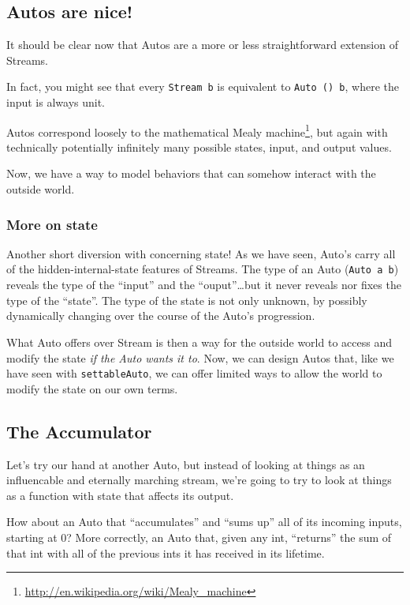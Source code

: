 \documentclass[]{article}
\renewcommand{\href}[2]{#2\footnote{\url{#1}}}
\begin{document}
\subsection{Autos are nice!}\label{autos-are-nice}

It should be clear now that Autos are a more or less straightforward
extension of Streams.

In fact, you might see that every \texttt{Stream\ b} is equivalent to
\texttt{Auto\ ()\ b}, where the input is always unit.

Autos correspond loosely to the mathematical
\href{http://en.wikipedia.org/wiki/Mealy_machine}{Mealy machine}, but
again with technically potentially infinitely many possible states,
input, and output values.

Now, we have a way to model behaviors that can somehow interact with the
outside world.

\subsubsection{More on state}\label{more-on-state}

Another short diversion with concerning state! As we have seen, Auto's
carry all of the hidden-internal-state features of Streams. The type of
an Auto (\texttt{Auto\ a\ b}) reveals the type of the ``input'' and the
``ouput''\ldots{}but it never reveals nor fixes the type of the
``state''. The type of the state is not only unknown, by possibly
dynamically changing over the course of the Auto's progression.

What Auto offers over Stream is then a way for the outside world to
access and modify the state \emph{if the Auto wants it to}. Now, we can
design Autos that, like we have seen with \texttt{settableAuto}, we can
offer limited ways to allow the world to modify the state on our own
terms.

\subsection{The Accumulator}\label{the-accumulator}

Let's try our hand at another Auto, but instead of looking at things as
an influencable and eternally marching stream, we're going to try to
look at things as a function with state that affects its output.

How about an Auto that ``accumulates'' and ``sums up'' all of its
incoming inputs, starting at 0? More correctly, an Auto that, given any
int, ``returns'' the sum of that int with all of the previous ints it
has received in its lifetime.
\end{document}
